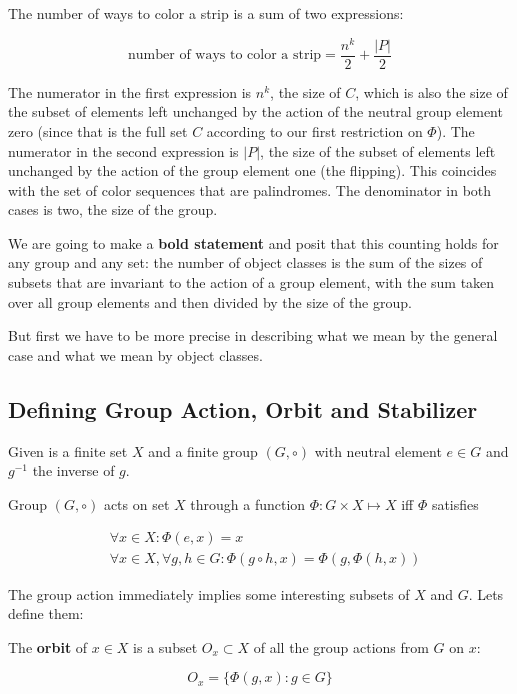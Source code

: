 The number of ways to color a strip is a sum of two expressions:

$$
\text{number of ways to color a strip} = \frac{n^k}{2} + \frac{|P|}{2}
$$

The numerator in the first expression is $n^k$, the size of $C$, which is also the size of the subset of elements left unchanged by the action of the neutral group element zero (since that is the full set $C$ according to our first restriction on $\Phi$). The numerator in the second expression is $|P|$, the size of the subset of elements left unchanged by the action of the group element one (the flipping). This coincides with the set of color sequences that are palindromes. The denominator in both cases is two, the size of the group.

We are going to make a \textbf{bold statement} and posit that this counting holds for any group and any set: the number of object classes is the sum of the sizes of subsets that are invariant to the action of a group element, with the sum taken over all group elements and then divided by the size of the group.

But first we have to be more precise in describing what we mean by the general case and what we mean by object classes.

\subsection{Defining Group Action, Orbit and Stabilizer}

Given is a finite set $X$ and a finite group $(G, \circ)$ with neutral element $e \in G$ and $g^{-1}$ the inverse of $g$. 

\begin{defn}\label{groupaction}
Group $(G, \circ)$ acts on set $X$ through a function $\Phi: G \times X \mapsto X$ iff $\Phi$ satisfies

\begin{align*}
&\forall x \in X: \Phi(e, x) = x \\
&\forall x \in X, \forall g, h \in G: \Phi(g \circ h, x) = \Phi(g, \Phi(h, x))
\end{align*}
\end{defn}

The group action immediately implies some interesting subsets of $X$ and $G$. Lets define them:

\begin{defn}\label{orbit}
The \textbf{orbit} of $x \in X$ is a subset $O_x \subset X$ of all the group actions from $G$ on $x$:

$$
O_x = \{\Phi(g, x): g \in G\}
$$
\end{defn}

